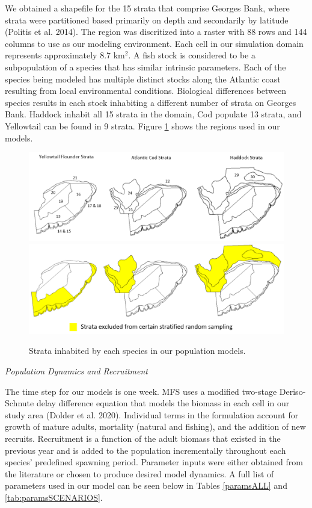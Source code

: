 \documentclass[
  12pt,
]{article}
\begin{document}
We obtained a shapefile for the 15 strata that comprise Georges Bank, where strata were partitioned based primarily on depth and secondarily by latitude (Politis et al. 2014). The region was discritized into a raster with 88 rows and 144 columns to use as our modeling environment. Each cell in our simulation domain represents approximately 8.7 km\(^2\). A fish stock is considered to be a subpopulation of a species that has similar intrinsic parameters. Each of the species being modeled has multiple distinct stocks along the Atlantic coast resulting from local environmental conditions. Biological differences between species results in each stock inhabiting a different number of strata on Georges Bank. Haddock inhabit all 15 strata in the domain, Cod populate 13 strata, and Yellowtail can be found in 9 strata. Figure \ref{fig:strata-plot} shows the regions used in our models.

\begin{figure}

{\centering \includegraphics[width=0.95\linewidth]{Images/Strata2} \includegraphics[width=0.95\linewidth]{Images/Excluded_strata2} 

}

\caption{Strata inhabited by each species in our population models.}\label{fig:strata-plot}
\end{figure}

\emph{Population Dynamics and Recruitment}

The time step for our models is one week. MFS uses a modified two-stage Deriso-Schnute delay difference equation that models the biomass in each cell in our study area (Dolder et al. 2020). Individual terms in the formulation account for growth of mature adults, mortality (natural and fishing), and the addition of new recruits. Recruitment is a function of the adult biomass that existed in the previous year and is added to the population incrementally throughout each species' predefined spawning period. Parameter inputs were either obtained from the literature or chosen to produce desired model dynamics. A full list of parameters used in our model can be seen below in Tables \ref{paramsALL} and \ref{tab:paramsSCENARIOS}.
\end{document}
